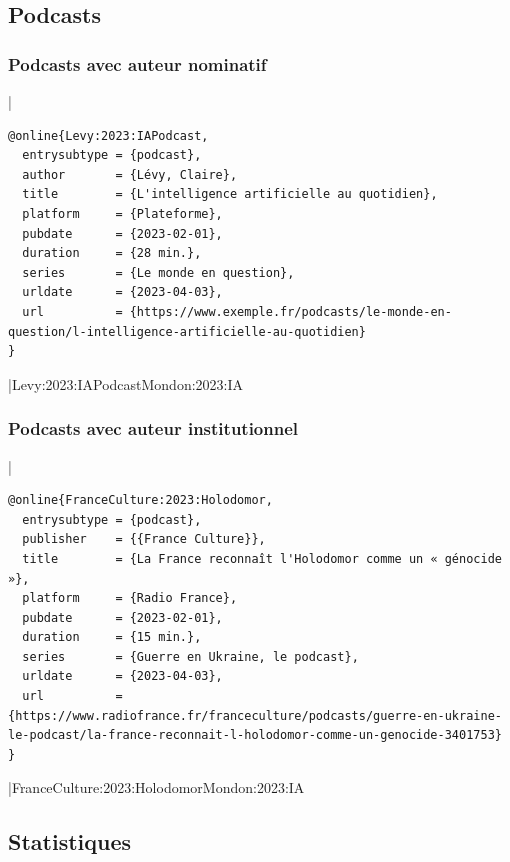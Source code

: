 \documentclass{article}
\begin{document}
\subsection{Podcasts}

\subsubsection{Podcasts avec auteur nominatif}

|
\begin{verbatim}
@online{Levy:2023:IAPodcast,
  entrysubtype = {podcast},
  author       = {Lévy, Claire},
  title        = {L'intelligence artificielle au quotidien},
  platform     = {Plateforme},
  pubdate      = {2023-02-01},
  duration     = {28 min.},
  series       = {Le monde en question},
  urldate      = {2023-04-03},
  url          = {https://www.exemple.fr/podcasts/le-monde-en-question/l-intelligence-artificielle-au-quotidien}
}
\end{verbatim}
|{Levy:2023:IAPodcast}{Mondon:2023:IA}

\subsubsection{Podcasts avec auteur institutionnel}

|
\begin{verbatim}
@online{FranceCulture:2023:Holodomor,
  entrysubtype = {podcast},
  publisher    = {{France Culture}},
  title        = {La France reconnaît l'Holodomor comme un « génocide »},
  platform     = {Radio France},
  pubdate      = {2023-02-01},
  duration     = {15 min.},
  series       = {Guerre en Ukraine, le podcast},
  urldate      = {2023-04-03},
  url          = {https://www.radiofrance.fr/franceculture/podcasts/guerre-en-ukraine-le-podcast/la-france-reconnait-l-holodomor-comme-un-genocide-3401753}
}
\end{verbatim}
|{FranceCulture:2023:Holodomor}{Mondon:2023:IA}

\subsection{Statistiques}
\end{document}
